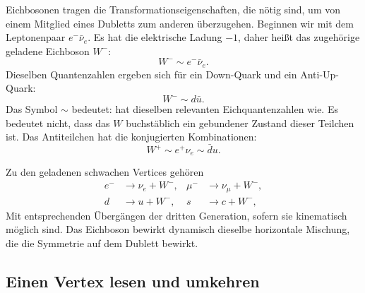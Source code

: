 Eichbosonen tragen die Transformationseigenschaften, die nötig sind, um von einem Mitglied eines Dubletts zum anderen überzugehen. Beginnen wir mit dem Leptonenpaar \(e^-\bar\nu_e\). Es hat die elektrische Ladung \(-1\), daher heißt das zugehörige geladene Eichboson \(W^-\):
\begin{equation}
W^-\sim e^-\bar\nu_e.
\end{equation}
Dieselben Quantenzahlen ergeben sich für ein Down-Quark und ein Anti-Up-Quark:
\begin{equation}
W^-\sim d\bar u.
\end{equation}
Das Symbol \(\sim\) bedeutet: hat dieselben relevanten Eichquantenzahlen wie. Es bedeutet nicht, dass das \(W\) buchstäblich ein gebundener Zustand dieser Teilchen ist. Das Antiteilchen hat die konjugierten Kombinationen:
\begin{equation}
W^+\sim e^+\nu_e\sim\bar d u.
\end{equation}

Zu den geladenen schwachen Vertices gehören
\begin{align}
e^-&\longrightarrow\nu_e+W^-,
&
\mu^-&\longrightarrow\nu_\mu+W^-,
\label{eq:l5-lepton-w}\\
d&\longrightarrow u+W^-,
&
s&\longrightarrow c+W^-,
\label{eq:l5-quark-w}
\end{align}
Mit entsprechenden Übergängen der dritten Generation, sofern sie kinematisch möglich sind. Das Eichboson bewirkt dynamisch dieselbe horizontale Mischung, die die Symmetrie auf dem Dublett bewirkt.

\begin{classroomqa}\end{classroomqa}

\subsection{Einen Vertex lesen und umkehren}

